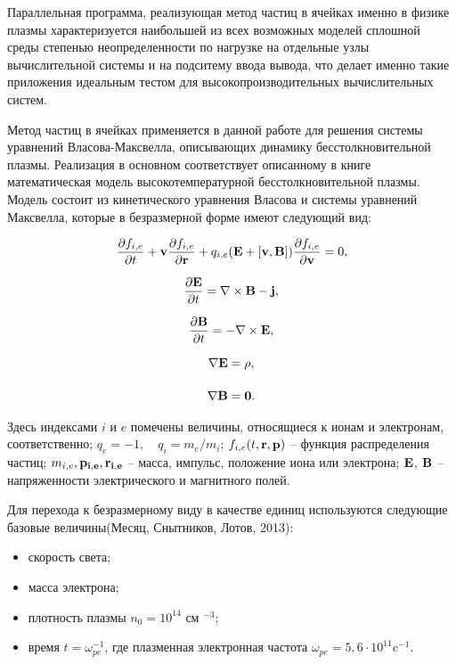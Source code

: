 Параллельная программа, реализующая  метод частиц в ячейках именно в физике плазмы характеризуется наибольшей из всех возможных моделей сплошной среды степенью неопределенности по нагрузке на отдельные узлы вычислительной системы и на подситему ввода вывода, что делает именно такие приложения идеальным тестом для высокопроизводительных вычислительных систем. 

Метод частиц в ячейках применяется в данной работе для решения системы уравнений Власова-Максвелла, описывающих динамику бесстолкновительной плазмы.
Реализация в основном соответствует описанному в книге \cite{VshivkovPICbook}
математическая модель высокотемпературной бесстолкновительной плазмы.
Модель состоит из кинетического уравнения Власова и системы
уравнений Максвелла, которые в безразмерной форме имеют
следующий вид:

\begin{equation}\label{eq:Vlas}
\frac{\partial f_{i,e}}{\partial t}+{\bf{v}} \frac{\partial f_{i,e}}{\partial \bf{r}}+q_{i,e}({\bf{E}}+[{\bf{v}},{\bf{B}}])\frac{\partial f_{i,e}}{\partial \bf{v}}=0, 
\end{equation}

\begin{equation}
\begin{array}{c}\displaystyle

\frac{\partial \bf{E}}{\partial t}=\nabla\times \bf{B} - \bf{j},  \label{eq:dE}
\\[5mm]\displaystyle
\frac{\partial \bf{B}}{\partial t}=-\nabla\times \bf{E},  \label{eq:dB}
\\[5mm]\displaystyle
\nabla \bf{E} = \rho, \label{eq:divE}
\\[5mm]\displaystyle
\nabla \bf{B} = 0.  \label{eq:divB}

\end{array}
\end{equation}

Здесь индексами $i$ и $e$ помечены величины, относящиеся к ионам и
электронам, со\-от\-ветст\-вен\-но; $q_e=-1, \quad q_i=m_e/m_i$; $f_{i,e}(t,\bf{r},\bf{p})$ --
функция распределения частиц; $m_{i,e}, \bf{p}_{i,e},
\bf{r}_{i,e}$ -- масса, импульс, положение иона или электрона;
$\bf{E}$, $\bf{B}$ -- напряженности электрического и магнитного
полей. 

Для перехода к безразмерному виду в качестве единиц
используются следующие базовые величины(Месяц, Снытников, Лотов, 2013):
\begin{itemize}
	\item скорость света;
	\item масса электрона;
	\item плотность плазмы $n_0=10^{14}$ см $^{-3}$;
	\item время $t=\omega _{pe}^{-1}$, где плазменная электронная частота $\omega_{pe} =5,6 \cdot 10^{11}$c$^{-1}$.
\end{itemize}

